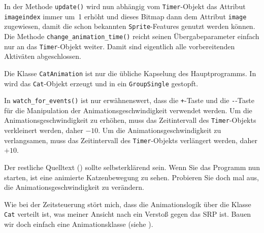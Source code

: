 In der Methode \texttt{update()} wird nun abhängig vom \texttt{Timer}-Objekt das Attribut \texttt{imageindex} immer um~1 erhöht und dieses Bitmap dann dem Attribut \texttt{image} zugewiesen, damit die schon bekannten \texttt{Sprite}-Features genutzt werden können. Die Methode \texttt{change\_\-ani\-ma\-tion\_\-time()} reicht seinen Übergabeparameter einfach nur an das \texttt{Timer}-Objekt weiter. Damit sind eigentlich alle vorbereitenden Aktiväten abgeschlossen.


Die Klasse \texttt{CatAnimation} ist nur die übliche Kapselung des Hauptprogramms. In  wird das \texttt{Cat}-Objekt erzeugt und in ein \texttt{GroupSingle} gestopft.


In \texttt{watch\_for\_events()} ist nur erwähnenswert, dass die \texttt{+}-Taste und die \texttt{-}-Taste für die Manipulation der Animationsgeschwindigkeit verwendet werden. Um die Animationsgeschwindigkeit zu erhöhen, muss das Zeitintervall des \texttt{Timer}-Objekts verkleinert werden, daher $-10$. Um die Animationsgeschwindigkeit zu verlangsamen, muss das Zeitintervall des \texttt{Timer}-Objekts verlängert werden, daher $+10$. 

\newpage
{} 

Der restliche Quelltext () sollte selbsterklärend sein. Wenn Sie das Programm nun starten, ist eine animierte Katzenbewegung zu sehen. Probieren Sie doch mal aus, die Animationsgeschwindigkeit zu verändern. 


Wie bei der Zeitsteuerung stört mich, dass die Animationslogik über die Klasse \texttt{Cat} verteilt ist, was meiner Ansicht nach ein Verstoß gegen das SRP ist. Bauen wir doch einfach eine Animationsklasse (siehe ).

